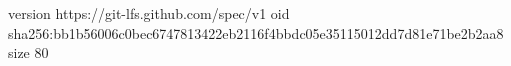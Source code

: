 version https://git-lfs.github.com/spec/v1
oid sha256:bb1b56006c0bec6747813422eb2116f4bbdc05e35115012dd7d81e71be2b2aa8
size 80
